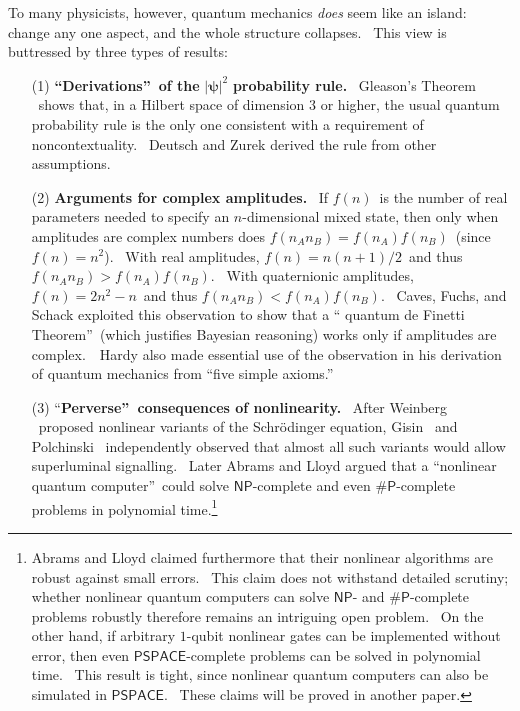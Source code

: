 \documentclass{article}%
\begin{document}
To many physicists, however, quantum mechanics \textit{does} seem like an
island: change any one aspect, and the whole structure collapses. \ This view
is buttressed by three types of results:

\begin{enumerate}
\item[(1)] \textbf{\textquotedblleft Derivations\textquotedblright\ of the
}$\left\vert \mathbf{\psi}\right\vert ^{2}$\textbf{ probability rule.}
\ Gleason's Theorem \cite{gleason}\ shows that, in a Hilbert space of dimension
$3$ or higher, the usual quantum probability rule is the only one consistent
with a requirement of noncontextuality. \ Deutsch \cite{deutsch} and
Zurek \cite{zurek} derived the rule from other assumptions.

\item[(2)] \textbf{Arguments for complex amplitudes.} \ If $f\left(  n\right)
$\ is the number of real parameters needed to specify an $n$-dimensional mixed
state, then only when amplitudes are complex numbers does $f\left(  n_{A}%
n_{B}\right)  =f\left(  n_{A}\right)  f\left(  n_{B}\right)  $\ (since
$f\left(  n\right)  =n^{2}$). \ With real amplitudes, $f\left(  n\right)
=n\left(  n+1\right)  /2$\ and thus $f\left(  n_{A}n_{B}\right)  >f\left(
n_{A}\right)  f\left(  n_{B}\right)  $. \ With quaternionic amplitudes,
$f\left(  n\right)  =2n^{2}-n$\ and thus $f\left(  n_{A}n_{B}\right)
<f\left(  n_{A}\right)  f\left(  n_{B}\right)  $. \ Caves, Fuchs, and
Schack \cite{cfs} exploited this observation to show that a \textquotedblleft
quantum de Finetti Theorem\textquotedblright\ (which justifies Bayesian
reasoning) works only if amplitudes are complex.\ \ Hardy \cite{hardy} also
made essential use of the observation in his derivation of quantum mechanics
from \textquotedblleft five simple axioms.\textquotedblright

\item[(3)] \textquotedblleft\textbf{Perverse\textquotedblright\ consequences
of nonlinearity.} \ After Weinberg \cite{weinberg}\ proposed nonlinear variants
of the Schr\"{o}dinger equation, Gisin \cite{gisin}\ and
Polchinski \cite{polchinski}\ independently observed that almost all such
variants would allow superluminal signalling. \ Later Abrams and
Lloyd \cite{al} argued that a \textquotedblleft nonlinear quantum
computer\textquotedblright\ could solve $\mathsf{NP}$-complete and even
$\mathsf{\#P}$-complete problems in polynomial time.\footnote{Abrams and Lloyd
claimed furthermore that their nonlinear algorithms are robust against small
errors. \ This claim does not withstand detailed scrutiny; whether nonlinear
quantum computers can solve $\mathsf{NP}$- and $\mathsf{\#P}$-complete
problems robustly therefore remains an intriguing open problem. \ On the other
hand, if arbitrary $1$-qubit nonlinear gates can be implemented without error,
then even $\mathsf{PSPACE}$-complete problems can be solved in polynomial
time. \ This result is tight, since nonlinear quantum computers can also be
simulated in $\mathsf{PSPACE}$. \ These claims will be proved in another paper.}
\end{enumerate}
\end{document}
